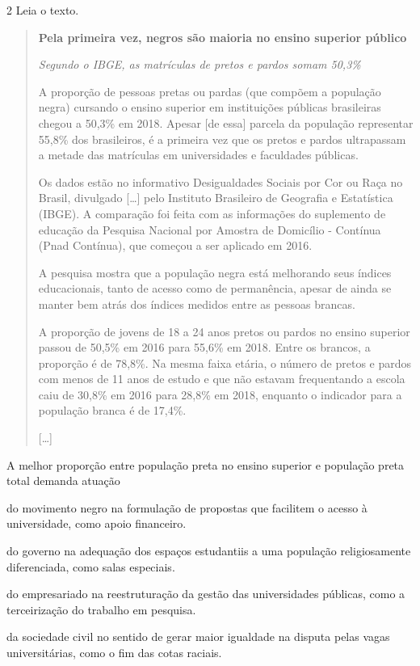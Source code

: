 \num{2} Leia o texto.

\begin{quote}
\textbf{Pela primeira vez, negros são maioria no ensino superior público}

\textit{Segundo o IBGE, as matrículas de pretos e pardos somam 50,3\%}

A proporção de pessoas pretas ou pardas (que compõem a população negra)
cursando o ensino superior em instituições públicas brasileiras chegou a
50,3\% em 2018. Apesar {[}de essa{]} parcela da população representar
55,8\% dos brasileiros, é a primeira vez que os pretos e pardos
ultrapassam a metade das matrículas em universidades e faculdades
públicas.

Os dados estão no informativo Desigualdades Sociais por Cor ou Raça no
Brasil, divulgado {[}\ldots{}{]} pelo Instituto Brasileiro de Geografia
e Estatística (IBGE). A comparação foi feita com as informações do
suplemento de educação da Pesquisa Nacional por Amostra de Domicílio -
Contínua (Pnad Contínua), que começou a ser aplicado em 2016.

A pesquisa mostra que a população negra está melhorando seus índices
educacionais, tanto de acesso como de permanência, apesar de ainda se
manter bem atrás dos índices medidos entre as pessoas brancas.

A proporção de jovens de 18 a 24 anos pretos ou pardos no ensino
superior passou de 50,5\% em 2016 para 55,6\% em 2018. Entre os brancos,
a proporção é de 78,8\%. Na mesma faixa etária, o número de pretos e
pardos com menos de 11 anos de estudo e que não estavam frequentando a
escola caiu de 30,8\% em 2016 para 28,8\% em 2018, enquanto o indicador
para a população branca é de 17,4\%.

{[}\ldots{}{]}

\end{quote}

A melhor proporção entre população preta no ensino superior e população
preta total demanda atuação

\begin{escolha}
\item
  do movimento negro na formulação de propostas que facilitem o acesso à
  universidade, como apoio financeiro.
\item
  do governo na adequação dos espaços estudantiis a uma população
  religiosamente diferenciada, como salas especiais.
\item
  do empresariado na reestruturação da gestão das universidades
  públicas, como a terceirização do trabalho em pesquisa.
\item
  da sociedade civil no sentido de gerar maior igualdade na disputa
  pelas vagas universitárias, como o fim das cotas raciais.
\end{escolha}

